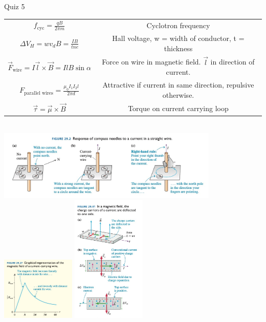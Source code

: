 \documentclass{article}
\begin{document}
\begin{center}
\begin{section}{Quiz 5}
\begin{tabular}{|c|c|}
		 $f_\text{cyc} = \frac{qB}{2 \pi m}$                                      & Cyclotron frequency                                                \\

		 $\Delta V_H = w v_d B = \frac{IB}{tne}$                                  & Hall voltage, w = width of conductor, t = thickness                \\

		 $\vec F_\text{wire} = I \vec l \times \vec B = IlB \sin \alpha$          & Force on wire in magnetic field. $\vec l$ in direction of current. \\

		 $F_\text{parallel wires} =  \frac{\mu_0 I_1 I_2 l}{2 \pi d}$             & Attractive if current in same direction, repulsive otherwise.      \\

		 $\vec \tau = \vec \mu \times \vec B$                                     & Torque on current carrying loop                                    \\
		 \hline
	 \end{tabular}
	 \\
	 \includegraphics[width=300pt]{final_cheet_sheet_resources/aqszphbxmjmblmaspimhdejdjiugbttc.jpg}
	 \includegraphics[width=100pt]{final_cheet_sheet_resources/kaozdeuaxhzkquewempuyqchdccgvzoq.jpg}
	 \includegraphics[width=100pt]{final_cheet_sheet_resources/mgsmwhhorrooccpddtidybfkximnvaok.jpg}
	\end{section}


\end{center}
\end{document}
